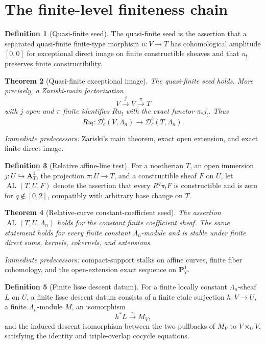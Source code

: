 \documentclass[10pt]{article}
\newtheorem{theorem}{Theorem}[section]
\theoremstyle{definition}
\newtheorem{definition}[theorem]{Definition}
\newcommand{\Dbc}{\mathcal D^b_c}
\newcommand{\pred}[1]{\par\smallskip\begingroup\footnotesize\raggedright
\emph{Immediate predecessors:} #1.\par\endgroup}
\begin{document}
\section{The finite-level finiteness chain}

\begin{definition}[Quasi-finite seed]
The quasi-finite seed is the assertion that a separated quasi-finite
finite-type morphism \(u:V\to T\) has cohomological amplitude \([0,0]\) for
exceptional direct image on finite constructible sheaves and that
\(u_!\) preserves finite constructibility.
\end{definition}

\begin{theorem}[Quasi-finite exceptional image]
The quasi-finite seed holds.  More precisely, a Zariski-main factorization
\[
 V\xrightarrow{j}\overline V\xrightarrow{\pi}T
\]
with \(j\) open and \(\pi\) finite identifies
\(Ru_!\) with the exact functor \(\pi_*j_!\).  Thus
\[
 Ru_!:\Dbc(V,\Lambda_n)\longrightarrow\Dbc(T,\Lambda_n).
\]
\end{theorem}
\pred{Zariski's main theorem, exact open extension, and exact finite direct image}

\begin{definition}[Relative affine-line test]
For a noetherian \(T\), an open immersion
\(j:U\hookrightarrow\mathbf A^1_T\), the projection
\(\pi:U\to T\), and a constructible sheaf \(F\) on \(U\), let
\(\operatorname{AL}(T,U,F)\) denote the assertion that every
\(R^q\pi_!F\) is constructible and is zero for \(q\notin[0,2]\), compatibly
with arbitrary base change on \(T\).
\end{definition}

\begin{theorem}[Relative-curve constant-coefficient seed]
The assertion \(\operatorname{AL}(T,U,\Lambda_n)\) holds for the constant
finite coefficient sheaf.  The same statement holds for every finite
constant \(\Lambda_n\)-module and is stable under finite direct sums,
kernels, cokernels, and extensions.
\end{theorem}
\pred{compact-support stalks on affine curves, finite fiber cohomology, and the open-extension exact sequence on \(\mathbf P^1_T\)}

\begin{definition}[Finite lisse descent datum]
For a finite locally constant \(\Lambda_n\)-sheaf \(L\) on \(U\), a finite
lisse descent datum consists of a finite etale surjection
\(h:V\to U\), a finite \(\Lambda_n\)-module \(M\), an isomorphism
\[
 h^*L\xrightarrow{\sim}M_V,
\]
and the induced descent isomorphism between the two pullbacks of \(M_V\) to
\(V\times_UV\), satisfying the identity and triple-overlap cocycle
equations.
\end{definition}
\end{document}
